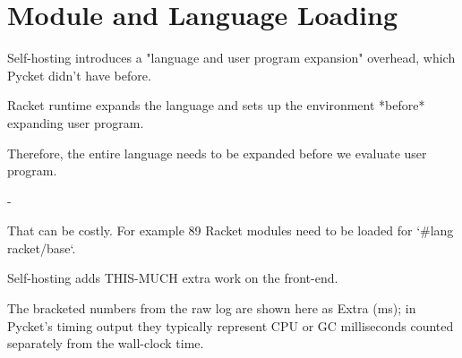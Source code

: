 	\section{Module and Language Loading}
	\label{section:module-and-language-loading}

		\begin{sectionpoint}
			Self-hosting introduces a "language and user program expansion" overhead, which Pycket didn't have before.
		\end{sectionpoint}

		\begin{paragraph-here}
			Racket runtime expands the language and sets up the environment *before* expanding user program.
		\end{paragraph-here}

		\begin{paragraph-here}
			Therefore, the entire language needs to be expanded before we evaluate user program.
		\end{paragraph-here}
-
		\begin{paragraph-here}
			That can be costly. For example 89 Racket modules need to be loaded for `\#lang racket/base`.
		\end{paragraph-here}

		\begin{paragraph-here}
			Self-hosting adds THIS-MUCH extra work on the front-end.

			The bracketed numbers from the raw log are shown here as Extra (ms); in Pycket’s timing output they typically represent CPU or GC milliseconds counted separately from the wall-clock time.
		\end{paragraph-here}

